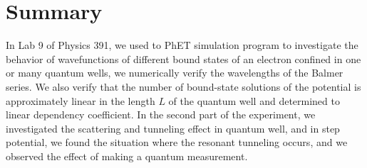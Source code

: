 \documentclass[11pt]{book}
\theoremstyle{break}
\theoremstyle{break}
\begin{document}
\section{Summary}
In Lab 9 of Physics 391, we used to PhET simulation program to investigate the behavior of wavefunctions of different bound states of an electron confined in one or many quantum wells, we numerically verify the wavelengths of the Balmer series. We also verify that the number of bound-state solutions of the potential is approximately linear in the length $L$ of the quantum well and determined to linear dependency coefficient. In the second part of the experiment, we investigated the scattering and tunneling effect in quantum well, and in step potential, we found the situation where the resonant tunneling occurs, and we observed the effect of making a quantum measurement. \\
\end{document}
